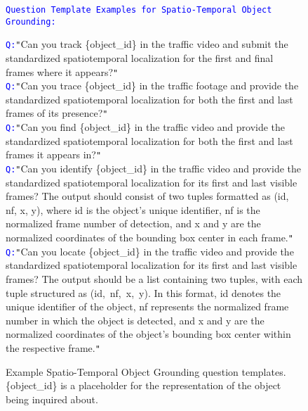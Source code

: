 
\begin{figure*}[htbp]
\centering
\begin{tcolorbox}[colback=gray!10,%
	colframe=black,%
	width=\textwidth,
	arc=1mm, auto outer arc,
	boxrule=0.5pt,
	]
\texttt{\textcolor{blue}{Question Template Examples for Spatio-Temporal Object Grounding:}}

\texttt{\textcolor{blue}{Q:}}\texttt{"}Can you track \mbox{\{object\_id\}} in the traffic video and submit the standardized spatiotemporal localization for the first and final frames where it appears?\texttt{"}\\
\texttt{\textcolor{blue}{Q:}}\texttt{"}Can you trace \mbox{\{object\_id\}} in the traffic footage and provide the standardized spatiotemporal localization for both the first and last frames of its presence?\texttt{"}\\
\texttt{\textcolor{blue}{Q:}}\texttt{"}Can you find \mbox{\{object\_id\}} in the traffic video and provide the standardized spatiotemporal localization for both the first and last frames it appears in?\texttt{"}\\
\texttt{\textcolor{blue}{Q:}}\texttt{"}Can you identify \mbox{\{object\_id\}} in the traffic video and provide the standardized spatiotemporal localization for its first and last visible frames? The output should consist of two tuples formatted as (id, nf, x, y), where id is the object's unique identifier, nf is the normalized frame number of detection, and x and y are the normalized coordinates of the bounding box center in each frame.\texttt{"}\\
\texttt{\textcolor{blue}{Q:}}\texttt{"}Can you locate \mbox{\{object\_id\}} in the traffic video and provide the standardized spatiotemporal localization for its first and last visible frames? The output should be a list containing two tuples, with each tuple structured as  \mbox{(id, nf, x, y)}. In this format, id denotes the unique identifier of the object, nf represents the normalized frame number in which the object is detected, and x and y are the normalized coordinates of the object's bounding box center within the respective frame.\texttt{"}

\end{tcolorbox}
\caption{Example Spatio-Temporal Object Grounding question templates. \mbox{\{object\_id\}} is a placeholder for the representation of the object being inquired about.}
\label{fig:sp_te_obj_gr_qa_templates}
\end{figure*}



